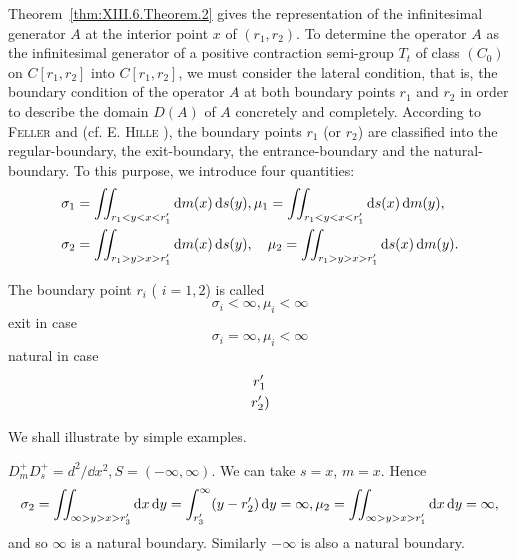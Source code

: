 \begin{remarkn}[Remark $2$] Theorem~\ref{thm:XIII.6.Theorem.2} gives the representation of the infinitesimal generator $A$ at the interior point $x$ of $(r_{1}, r_{2})$. To determine the operator $A$ as the infinitesimal generator of a positive contraction semi-group $T_{t}$ of class $(C_{0})$ on $C[r_{1}, r_{2}]$ into $C[r_{1}, r_{2}]$, we must consider the lateral condition, that is, the boundary condition of the operator $A$ at both boundary points $r_{1}$ and $r_{2}$ in order to describe the domain $D(A)$ of $A$ concretely and completely. According to \textsc{Feller} \cite{erdelyi57} and \cite{erdelyi61} (cf. E. \textsc{Hille} \cite{hille102}), the boundary points $r_{1}$ (or $r_{2}$) are classified into the regular-boundary, the exit-boundary, the entrance-boundary and the natural-boundary. To this purpose, we introduce four quantities: 
\begin{align}
\sigma_{1}& = \iint_ {r _{1} < y < x < r _{1} ^{\prime}} \dd m (x) \dd s (y), \mu_{1} = \iint_ {r _{1} < y < x < r _{1} ^{\prime}} \dd s (x) \dd m (y), \notag \\
\sigma_{2}& = \iint_ {r _{1} > y > x > r _{1} ^{\prime}} \dd m (x) \dd s (y), \quad \mu_{2} = \iint_ {r _{1} > y > x > r _{1} ^{\prime}} \dd s (x) \dd m (y). \notag
\end{align}
\end{remarkn}

The boundary point $r_i$ ( $i = 1, 2$) is called 
\[
\sigma_{i} < \infty , \mu_{i} < \infty
\]
exit in case 
\[
\sigma_{i} = \infty , \mu_{i} < \infty
\]
natural in case 
\begin{gather}r _{1} ^{\prime} \notag \\\left. r _{2} ^{\prime}\right) \notag
\end{gather}

We shall illustrate by simple examples. 

\begin{example}\label{ex:XIII.6.Example.1} $D_{m}^{+}D_{s}^{+} = d^{2} / \dd x^{2}, S = (-\infty, \infty)$. We can take $s = x$, $m = x$. Hence 
\begin{equation}\sigma_{2} = \iint_ {\infty > y > x > r _{3} ^{\prime}} \mathop{}\!\mathrm{d} x \mathop{}\!\mathrm{d} y = \int_ {r _{3} ^{\prime}} ^{\infty} (y - r _{2} ^{\prime}) \mathop{}\!\mathrm{d} y = \infty , \mu_{2} = \iint_ {\infty > y > x > r _{1} ^{\prime}} \mathop{}\!\mathrm{d} x \mathop{}\!\mathrm{d} y = \infty , \notag\end{equation}
and so $\infty$ is a natural boundary. Similarly $-\infty$ is also a natural boundary. 
\end{example}

